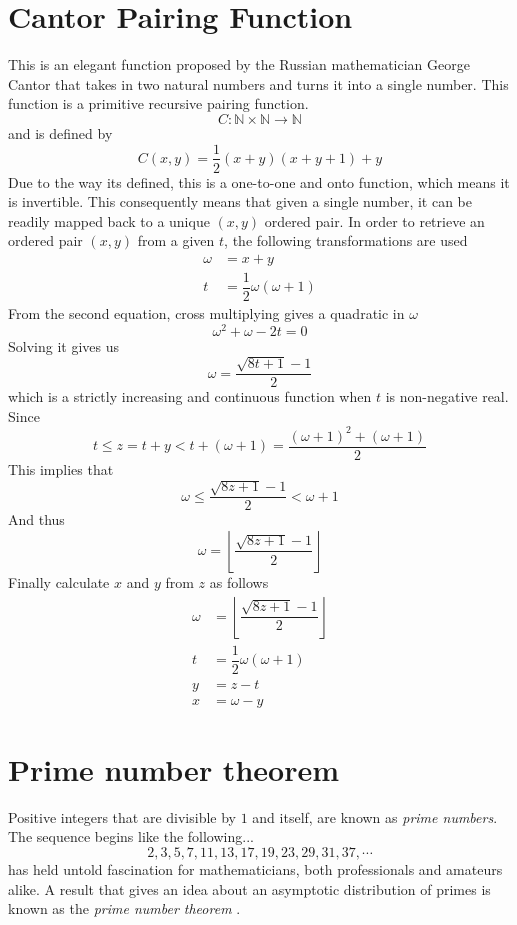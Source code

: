\section{Cantor Pairing Function}
\label{sec:4}
This is an elegant function proposed by the Russian mathematician George Cantor that takes in two natural numbers and turns it into a single number. This function is a primitive recursive pairing function. $$C:\mathbb{N}\times\mathbb{N}\to\mathbb{N}$$
and is defined by $$C(x,y)=\dfrac12(x+y)(x+y+1)+y$$
Due to the way its defined, this is a one-to-one and onto function, which means it is invertible. This consequently means that given a single number, it can be readily mapped back to a unique $(x,y)$ ordered pair. In order to retrieve an ordered pair $(x,y)$ from a given $t$, the following transformations are used
    \begin{align*}
        \omega&=x+y\\
        t&=\dfrac12\omega(\omega+1)
    \end{align*}
From the second equation, cross multiplying gives a quadratic in $\omega$
$$\omega^2+\omega-2t=0$$
Solving it gives us
$$\omega=\dfrac{\sqrt{8t+1}-1}{2}$$
which is a strictly increasing and continuous function when $t$ is non-negative real. Since $$t\le z=t+y<t+(\omega+1)=\dfrac{(\omega+1)^2+(\omega+1)}2$$
This implies that
$$\omega\le\dfrac{\sqrt{8z+1}-1}2<\omega+1$$
And thus
$$\omega=\left\lfloor\dfrac{\sqrt{8z+1}-1}2\right\rfloor$$
Finally calculate $x$ and $y$ from $z$ as follows
    \begin{align*}
        \omega&=\left\lfloor\dfrac{\sqrt{8z+1}-1}2\right\rfloor\\
        t&=\dfrac12\omega(\omega+1)\\
        y&=z-t\\
        x&=\omega-y
    \end{align*}

\FloatBarrier
\section{Prime number theorem}
\label{sec:5}
Positive integers that are divisible by $1$ and itself, are known as \textit{prime numbers}. The sequence begins like the following... $$2, 3, 5, 7, 11, 13, 17, 19, 23, 29, 31, 37, \cdots$$ has held untold fascination for mathematicians, both professionals and amateurs alike. A result that gives an idea about an asymptotic distribution of primes is known as the \textit{prime number theorem} \cite{goldstein1973history}.

